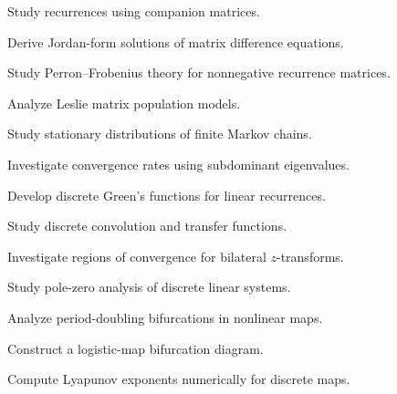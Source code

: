 \begin{exercise}[4]
Study recurrences using companion matrices.
\end{exercise}

\begin{exercise}[4]
Derive Jordan-form solutions of matrix difference equations.
\end{exercise}

\begin{exercise}[4]
Study Perron--Frobenius theory for nonnegative recurrence matrices.
\end{exercise}

\begin{exercise}[4]
Analyze Leslie matrix population models.
\end{exercise}

\begin{exercise}[4]
Study stationary distributions of finite Markov chains.
\end{exercise}

\begin{exercise}[4]
Investigate convergence rates using subdominant eigenvalues.
\end{exercise}

\begin{exercise}[4]
Develop discrete Green's functions for linear recurrences.
\end{exercise}

\begin{exercise}[4]
Study discrete convolution and transfer functions.
\end{exercise}

\begin{exercise}[4]
Investigate regions of convergence for bilateral \(z\)-transforms.
\end{exercise}

\begin{exercise}[4]
Study pole-zero analysis of discrete linear systems.
\end{exercise}

\begin{exercise}[4]
Analyze period-doubling bifurcations in nonlinear maps.
\end{exercise}

\begin{exercise}[4]
Construct a logistic-map bifurcation diagram.
\end{exercise}

\begin{exercise}[4]
Compute Lyapunov exponents numerically for discrete maps.
\end{exercise}

